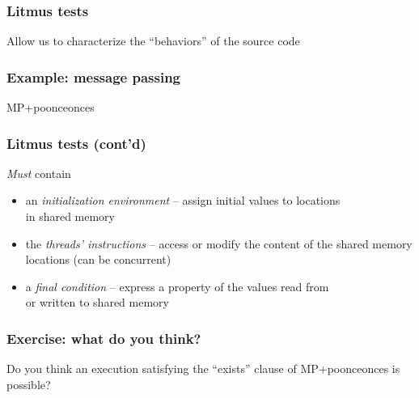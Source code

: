 \documentclass[usenames,dvipsnames]{beamer}
\begin{document}
\begin{frame}[fragile]
\frametitle{Litmus tests}

Allow us to characterize the ``behaviors'' of the source code

\end{frame}


\begin{frame}[fragile]
\frametitle{Example: message passing}

\begin{center}
MP+poonceonces
\end{center}

\end{frame}


\begin{frame}[fragile]
\frametitle{Litmus tests (cont'd)}

\emph{Must} contain
\begin{itemize}
\vspace{1mm}
	\item an \emph{initialization environment} -- assign initial values to
	locations \\ in shared memory

\vspace{2mm}
	\item the \emph{threads' instructions} -- access or modify the content
	of the shared memory locations (can be concurrent)

\vspace{2mm}
	\item a \emph{final condition} -- express a property of the values read
	from \\ or written to shared memory
\end{itemize}

\end{frame}


\begin{frame}[fragile]
\frametitle{Exercise: what do you think?}

Do you think an execution satisfying the ``exists'' clause of
MP+poonceonces is possible?

\end{frame}
\end{document}
